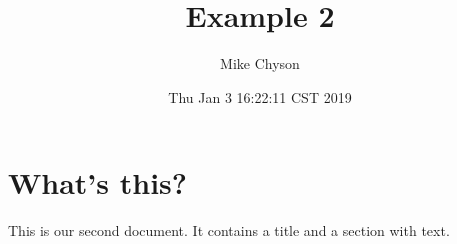\documentclass[a4paper,11pt]{article}
\begin{document}
\title{Example 2}
\author{Mike Chyson}
\date{Thu Jan  3 16:22:11 CST 2019}
\maketitle
\section{What's this?}
This is our second document. It contains a title and a section with text.
\end{document}
